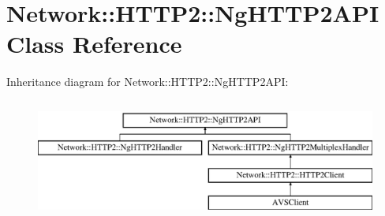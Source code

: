 \hypertarget{classNetwork_1_1HTTP2_1_1NgHTTP2API}{}\section{Network\+:\+:H\+T\+T\+P2\+:\+:Ng\+H\+T\+T\+P2\+A\+PI Class Reference}
\label{classNetwork_1_1HTTP2_1_1NgHTTP2API}
Inheritance diagram for Network\+:\+:H\+T\+T\+P2\+:\+:Ng\+H\+T\+T\+P2\+A\+PI\+:\begin{figure}[H]
\begin{center}
\leavevmode
\includegraphics[height=4.000000cm]{dc/db7/classNetwork_1_1HTTP2_1_1NgHTTP2API}
\end{center}
\end{figure}
